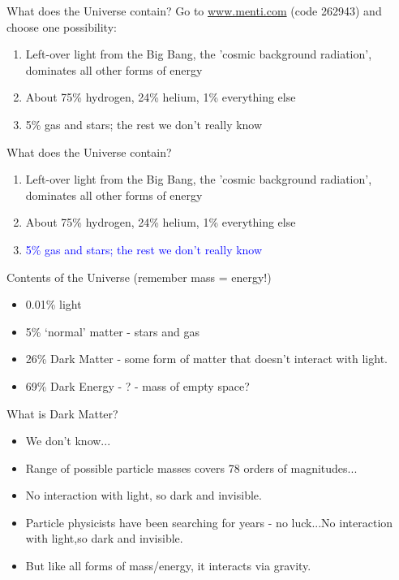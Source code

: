 \documentclass[usenames,dvipsnames]{beamer}
\newcommand{\mentiurl}[0]{{\url{www.menti.com}}}
\newcommand{\menticode}[0]{{262943}}
\newcommand{\correctanswer}[1]{\textcolor{blue}{{#1} \checkmark}}
\begin{document}
\begin{frame}{What does the Universe contain?}
    Go to \mentiurl{} (code \menticode{}) and choose one possibility:\\
    \begin{enumerate}
      \item{Left-over light from the Big Bang, the 'cosmic background radiation', dominates all other forms of energy}
      \item{About 75\% hydrogen, 24\% helium, 1\% everything else}
      \item{5\% gas and stars; the rest we don't really know}
    \end{enumerate}
\end{frame}


\begin{frame}{What does the Universe contain?}
    \begin{enumerate}
      \item{Left-over light from the Big Bang, the 'cosmic background radiation', dominates all other forms of energy}
      \item{About 75\% hydrogen, 24\% helium, 1\% everything else}
      \item{\correctanswer{5\% gas and stars; the rest we don't really know}}
    \end{enumerate}
\end{frame}


\begin{frame}{Contents of the Universe (remember mass = energy!)}
  \begin{block}{}
    \begin{itemize}
      \item{0.01\% light}
      \item{5\% `normal' matter - stars and gas}
      \item{26\% Dark Matter - some form of matter that doesn't interact with light.}
      \item{69\% Dark Energy - ? - mass of empty space?}
    \end{itemize}
  \end{block}
\end{frame}


\begin{frame}{What is Dark Matter?}
  \begin{block}{}
    \begin{itemize}
      \item{We don't know...}
      \item{Range of possible particle masses covers 78 orders of magnitudes...}
      \item{No interaction with light, so dark and invisible.}
      \item{Particle physicists have been searching for years - no luck...No interaction with light,so dark and invisible.}
      \item{But like all forms of mass/energy, it interacts via gravity.}
    \end{itemize}
  \end{block}
\end{frame}
\end{document}
